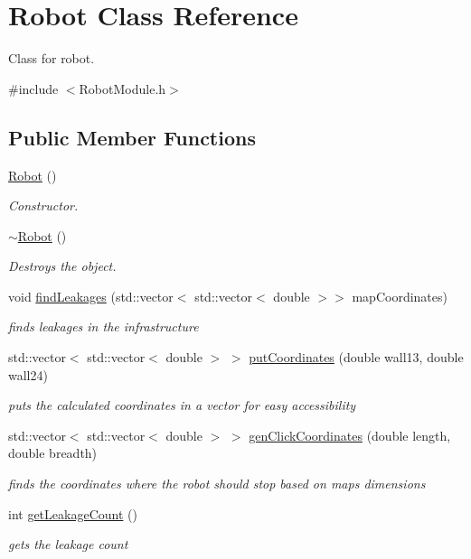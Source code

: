 \hypertarget{class_robot}{}\section{Robot Class Reference}
\label{class_robot}


Class for robot.  




{\ttfamily \#include $<$Robot\+Module.\+h$>$}

\subsection*{Public Member Functions}
\begin{DoxyCompactItemize}
\item 
\mbox{\hyperlink{class_robot_a4fc7c70ae20623f05e06f2ecb388b6c4}{Robot}} ()
\begin{DoxyCompactList}\small\item\em Constructor. \end{DoxyCompactList}\item 
\mbox{\hyperlink{class_robot_a924320124b09c2f2ac1621aa210d5f38}{$\sim$\+Robot}} ()
\begin{DoxyCompactList}\small\item\em Destroys the object. \end{DoxyCompactList}\item 
void \mbox{\hyperlink{class_robot_a6fc2afb98404e44c737231dbad1f5fe6}{find\+Leakages}} (std\+::vector$<$ std\+::vector$<$ double $>$$>$ map\+Coordinates)
\begin{DoxyCompactList}\small\item\em finds leakages in the infrastructure \end{DoxyCompactList}\item 
std\+::vector$<$ std\+::vector$<$ double $>$ $>$ \mbox{\hyperlink{class_robot_aac72211bc05d19f5e219d561bf47f73f}{put\+Coordinates}} (double wall13, double wall24)
\begin{DoxyCompactList}\small\item\em puts the calculated coordinates in a vector for easy accessibility \end{DoxyCompactList}\item 
std\+::vector$<$ std\+::vector$<$ double $>$ $>$ \mbox{\hyperlink{class_robot_a4513409a1fd7ec6e9b271d268d7b8217}{gen\+Click\+Coordinates}} (double length, double breadth)
\begin{DoxyCompactList}\small\item\em finds the coordinates where the robot should stop based on map\textquotesingle{}s dimensions \end{DoxyCompactList}\item 
int \mbox{\hyperlink{class_robot_a96b474911213f373d2928f59e77a0fde}{get\+Leakage\+Count}} ()
\begin{DoxyCompactList}\small\item\em gets the leakage count \end{DoxyCompactList}\end{DoxyCompactItemize}


